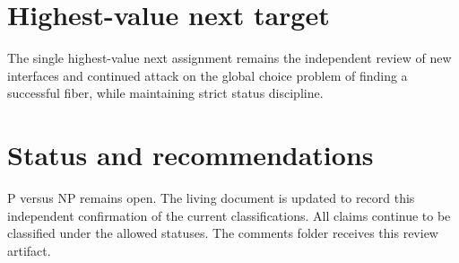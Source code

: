 \documentclass[11pt]{article}
\begin{document}
\section{Highest-value next target}
The single highest-value next assignment remains the independent review of new interfaces and continued attack on the global choice problem of finding a successful fiber, while maintaining strict status discipline.

\section{Status and recommendations}
P versus NP remains open. The living document is updated to record this independent confirmation of the current classifications. All claims continue to be classified under the allowed statuses. The comments folder receives this review artifact.

\end{document}
